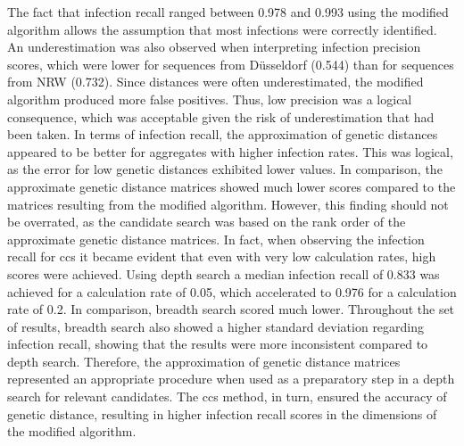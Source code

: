 The fact that infection recall ranged between 0.978 and 0.993 using the modified algorithm allows the assumption that most infections were correctly identified. An underestimation was also observed when interpreting infection precision scores, which were lower for sequences from Düsseldorf (0.544) than for sequences from NRW (0.732). Since distances were often underestimated, the modified algorithm produced more false positives. Thus, low precision was a logical consequence, which was acceptable given the risk of underestimation that had been taken. In terms of infection recall, the approximation of genetic distances appeared to be better for aggregates with higher infection rates. This was logical, as the error for low genetic distances exhibited lower values. In comparison, the approximate genetic distance matrices showed much lower scores compared to the matrices resulting from the modified algorithm. However, this finding should not be overrated, as the candidate search was based on the rank order of the approximate genetic distance matrices. In fact, when observing the infection recall for \acrshort{ccs} it became evident that even with very low calculation rates, high scores were achieved. Using depth search a median infection recall of 0.833 was achieved for a calculation rate of 0.05, which accelerated to 0.976 for a calculation rate of 0.2. In comparison, breadth search scored much lower. Throughout the set of results, breadth search also showed a higher standard deviation regarding infection recall, showing that the results were more inconsistent compared to depth search. Therefore, the approximation of genetic distance matrices represented an appropriate procedure when used as a preparatory step in a depth search for relevant candidates. The \acrshort{ccs} method, in turn, ensured the accuracy of genetic distance, resulting in higher infection recall scores in the dimensions of the modified algorithm.

